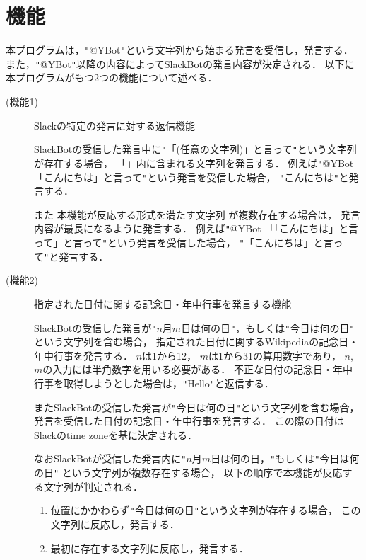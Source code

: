 \documentclass[fleqn, 14pt]{extarticlej}
\begin{document}
\section{機能}
\label{sec:function}
本プログラムは，\verb|"|@YBot\verb|"|という文字列から始まる発言を受信し，発言する．
また，\verb|"|@YBot\verb|"|以降の内容によってSlackBotの発言内容が決定される．
以下に本プログラムがもつ2つの機能について述べる．
\begin{description}
\item[(機能1)]\label{item:function1}
  Slackの特定の発言に対する返信機能

  SlackBotの受信した発言中に\verb|"|「(任意の文字列)」と言って\verb|"|という文字列が存在する場合，
  「」内に含まれる文字列を発言する．
  例えば\verb|"|@YBot 「こんにちは」と言って\verb|"|という発言を受信した場合，
  \verb|"|こんにちは\verb|"|と発言する．

  
  また
  本機能が反応する形式を満たす文字列
  が複数存在する場合は，
  発言内容が最長になるように発言する．
  例えば\verb|"|@YBot 「「こんにちは」と言って」と言って\verb|"|という発言を受信した場合，
  \verb|"|「こんにちは」と言って\verb|"|と発言する．
  
\item[(機能2)]\label{item:function2}
  指定された日付に関する記念日・年中行事を発言する機能

  SlackBotの受信した発言が\verb|"|$n$月$m$日は何の日\verb|"|，もしくは\verb|"|今日は何の日\verb|"|
  という文字列を含む場合，
  指定された日付に関するWikipediaの記念日・年中行事を発言する．
  $n$は1から12，
  $m$は1から31の算用数字であり，
  $n$, $m$の入力には半角数字を用いる必要がある．
  不正な日付の記念日・年中行事を取得しようとした場合は，\verb|"|Hello\verb|"|と返信する．
  
  またSlackBotの受信した発言が\verb|"|今日は何の日\verb|"|という文字列を含む場合，
  発言を受信した日付の記念日・年中行事を発言する．
  この際の日付はSlackのtime zoneを基に決定される．
  
  なおSlackBotが受信した発言内に\verb|"|$n$月$m$日は何の日，\verb|"|もしくは\verb|"|今日は何の日\verb|"|
  という文字列が複数存在する場合，
  以下の順序で本機能が反応する文字列が判定される．
  \begin{enumerate}
  \item{}
    位置にかかわらず\verb|"|今日は何の日\verb|"|という文字列が存在する場合，
    この文字列に反応し，発言する．
    
  \item{}
    最初に存在する文字列に反応し，発言する．
    

\end{enumerate}
\end{description}
\end{document}
